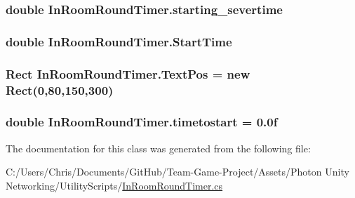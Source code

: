 \subsubsection[{\texorpdfstring{starting\+\_\+severtime}{starting_severtime}}]{\setlength{\rightskip}{0pt plus 5cm}double In\+Room\+Round\+Timer.\+starting\+\_\+severtime}\hypertarget{class_in_room_round_timer_a2399b0658c888b108f2c75f9d2fbb41c}{}\label{class_in_room_round_timer_a2399b0658c888b108f2c75f9d2fbb41c}
\subsubsection[{\texorpdfstring{Start\+Time}{StartTime}}]{\setlength{\rightskip}{0pt plus 5cm}double In\+Room\+Round\+Timer.\+Start\+Time}\hypertarget{class_in_room_round_timer_a22ba8013f8081643dfffeb95e049a97c}{}\label{class_in_room_round_timer_a22ba8013f8081643dfffeb95e049a97c}
\subsubsection[{\texorpdfstring{Text\+Pos}{TextPos}}]{\setlength{\rightskip}{0pt plus 5cm}Rect In\+Room\+Round\+Timer.\+Text\+Pos = new Rect(0,80,150,300)}\hypertarget{class_in_room_round_timer_a1844d64936fc01a304de92179ac0cd4e}{}\label{class_in_room_round_timer_a1844d64936fc01a304de92179ac0cd4e}
\subsubsection[{\texorpdfstring{timetostart}{timetostart}}]{\setlength{\rightskip}{0pt plus 5cm}double In\+Room\+Round\+Timer.\+timetostart = 0.\+0f}\hypertarget{class_in_room_round_timer_aa0c3ea404ae1bc85c1cc36626ae2bed8}{}\label{class_in_room_round_timer_aa0c3ea404ae1bc85c1cc36626ae2bed8}


The documentation for this class was generated from the following file\+:\begin{DoxyCompactItemize}
\item 
C\+:/\+Users/\+Chris/\+Documents/\+Git\+Hub/\+Team-\/\+Game-\/\+Project/\+Assets/\+Photon Unity Networking/\+Utility\+Scripts/\hyperlink{_in_room_round_timer_8cs}{In\+Room\+Round\+Timer.\+cs}\end{DoxyCompactItemize}
